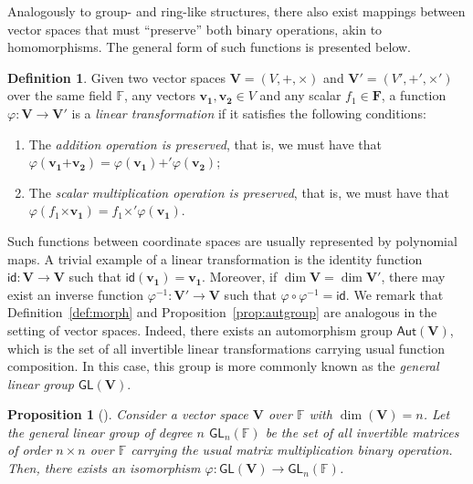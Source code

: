 \documentclass[draft, 12pt, a4paper, oneside]{memoir}
\newtheorem{proposition}[theorem]{Proposition}
\theoremstyle{definition}
\newtheorem{definition}[theorem]{Definition}
\begin{document}
Analogously to group- and ring-like structures, there also exist mappings between vector spaces that must ``preserve'' both binary operations, akin to homomorphisms. The general form of such functions is presented below.

\begin{definition}
  Given two vector spaces $\mathbf{V} = (V, \bm{+}, \bm{\times})$ and $\mathbf{V'} = (V', \bm{+'}, \bm{\times'})$ over the same field $\mathbb{F}$, any vectors $\mathbf{v_{1}}, \mathbf{v_{2}} \in V$ and any scalar $f_{1} \in \mathbf{F}$, a function $\varphi : \mathbf{V} \to \mathbf{V'}$ is a \emph{linear transformation} if it satisfies the following conditions:
  
  \begin{enumerate}
    \item The \emph{addition operation is preserved}, that is, we must have that $\varphi(\mathbf{v_{1}} \bm{+} \mathbf{v_{2}}) = \varphi(\mathbf{v_{1}}) \bm{+'} \varphi(\mathbf{v_{2}})$;
    \item The \emph{scalar multiplication operation is preserved}, that is, we must have that $\varphi(f_{1} \bm{\times} \mathbf{v_{1}}) = f_{1} \bm{\times'} \varphi(\mathbf{v_{1}})$.
  \end{enumerate} 
\end{definition}

Such functions between coordinate spaces are usually represented by polynomial maps. A trivial example of a linear transformation is the identity function $\mathsf{id} : \mathbf{V} \to \mathbf{V}$ such that $\mathsf{id}(\mathbf{v_{1}}) = \mathbf{v_{1}}$. Moreover, if $\dim \mathbf{V} = \dim \mathbf{V'}$, there may exist an inverse function $\varphi^{-1} : \mathbf{V'} \to \mathbf{V}$ such that $\varphi \circ \varphi^{-1} = \mathsf{id}$. We remark that Definition~\ref{def:morph} and Proposition~\ref{prop:autgroup} are analogous in the setting of vector spaces. Indeed, there exists an automorphism group $\mathsf{Aut}(\mathbf{V})$, which is the set of all invertible linear transformations carrying usual function composition. In this case, this group is more commonly known as the \emph{general linear group} $\mathsf{GL}(\mathbf{V})$.

\begin{proposition}[{\cite[p. 418, Cor. 14]{Dummit:2003}}]
  Consider a vector space $\mathbf{V}$ over $\mathbb{F}$ with $\dim(\mathbf{V}) = n$. Let the general linear group of degree $n$ $\mathsf{GL}_{n}(\mathbb{F})$ be the set of all invertible matrices of order $n \times n$ over $\mathbb{F}$ carrying the usual matrix multiplication binary operation. Then, there exists an isomorphism $\varphi : \mathsf{GL}(\mathbf{V}) \to \mathsf{GL}_{n}(\mathbb{F})$.
\end{proposition}
\end{document}
